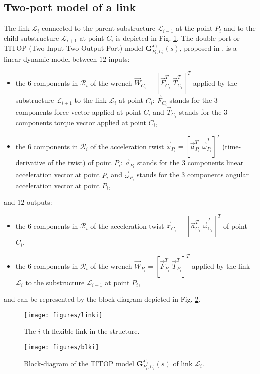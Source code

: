 \subsection{Two-port model of a link} The link $\mathcal{L}_{i}$ connected to the parent substructure $\mathcal{L}_{i-1}$ at the point $P_i$ %
 and to the child substructure $\mathcal{L}_{i+1}$ at point $C_i$ is depicted in Fig. \ref{fig:linki}. The double-port or TITOP (Two-Input Two-Output Port) model $\mathbf{G}_{P_i,C_i}^{\mathcal{L}_i}(s)$, proposed in \cite{Alazard2015}, is a linear dynamic model between $12$ inputs:
\begin{itemize}
\item the 6 components in $\mathcal{R}_i$ of the wrench $\vec{W}_{C_i}=[\vec{F}_{C_i}^T\;\vec{T}_{C_i}^T]^T$ applied by the substructure $\mathcal{L}_{i+1}$ to the link $\mathcal{L}_{i}$ at point $C_i$: $\vec{F}_{C_i}$ stands for the 3 components force vector applied at point $C_i$ and $\vec{T}_{C_i}$ stands for the 3 components torque vector applied at point $C_i$,
\item the 6 components in $\mathcal{R}_i$ of the acceleration twist $\vec{\ddot{x}}_{P_i}=[\vec{a}_{P_i}^T\;\dot{\vec{\omega}}_{P_i}^T]^T$  (time-derivative of the twist) of point $P_i$: $\vec{a}_{P_i}$ stands for the 3 components linear acceleration vector at point $P_i$ and $\dot{\vec{\omega}}_{P_i}$ stands for the 3 components angular acceleration vector at point $P_i$,
\end{itemize}
and $12$ outputs:
\begin{itemize}
\item the 6 components in $\mathcal{R}_i$ of the acceleration twist $\vec{\ddot{x}}_{C_i}=[\vec{a}_{C_i}^T\;\dot{\vec{\omega}}_{C_i}^T]^T$  of point $C_i$,
\item the 6 components in $\mathcal{R}_i$ of the wrench $\vec{W}_{P_i}=[\vec{F}_{P_i}^T\;\vec{T}_{P_i}^T]^T$ applied by the link $\mathcal{L}_{i}$ to the substructure $\mathcal{L}_{i-1}$ at point $P_i$,
\end{itemize}
and can be represented by the block-diagram depicted in Fig. \ref{fig:blki}. 

\begin{figure}[htbp!]
  \texttt{[image: figures/linki]}
\caption{The $i$-th flexible link in the structure.}
\label{fig:linki} 
\end{figure}

\begin{figure}[htbp!]
  \texttt{[image: figures/blki]}
\caption{Block-diagram of the TITOP model $\mathbf{G}_{P_i,C_i}^{\mathcal{L}_i}(s)$ of link $\mathcal{L}_i$.}
\label{fig:blki} 
\end{figure}

